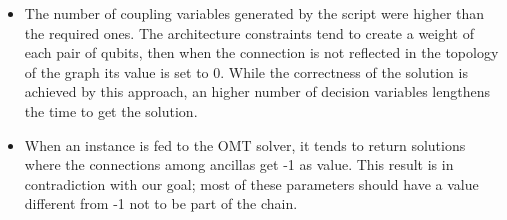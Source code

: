 \begin{itemize}
    \item The number of coupling variables generated by the script were higher than the required ones. The architecture constraints tend to create a weight of each pair of qubits, then when the connection is not reflected in the topology of the graph its value is set to 0. While the correctness of the solution is achieved by this approach, an higher number of decision variables lengthens the time to get the solution.
    \item When an instance is fed to the OMT solver, it tends to return solutions where the connections among ancillas get -1 as value. This result is in contradiction with our goal; most of these parameters should have a value different from -1 not to be part of the chain.
\end{itemize}

\pagebreak

